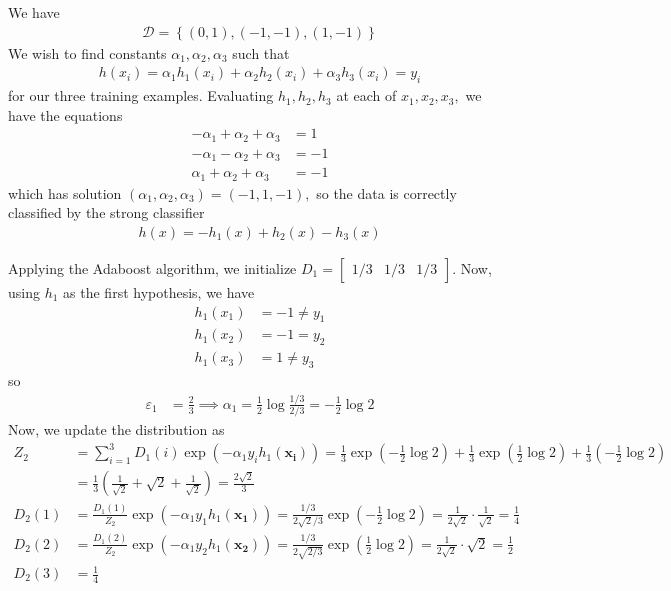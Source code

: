 \documentclass{article}
\begin{document}
\begin{soln}
	We have
	\begin{align*}
		\mathcal D = \left\{ (0, 1), (-1, -1), (1, -1) \right\}
	\end{align*}
	We wish to find constants $\alpha_1, \alpha_2, \alpha_3$ such that
	\begin{align*}
		h(x_i) = \alpha_1h_1(x_i) + \alpha_2h_2(x_i) + \alpha_3h_3(x_i) = y_i
	\end{align*}
	for our three training examples. Evaluating $h_1, h_2, h_3$ at each of $x_1, x_2, x_3,$ we have the equations
	\begin{align*}
		-\alpha_1 + \alpha_2 + \alpha_3 &= 1 \\
		-\alpha_1 - \alpha_2 + \alpha_3 &= -1 \\
		\alpha_1+\alpha_2+\alpha_3 &= -1
	\end{align*}
	which has solution $(\alpha_1, \alpha_2, \alpha_3) = (-1, 1, -1),$ so the data is correctly classified by the strong classifier 
	\begin{align*}
		h(x) = -h_1(x) + h_2(x) - h_3(x)
	\end{align*}

	Applying the Adaboost algorithm, we initialize $D_1 = \begin{bmatrix}
		1/3 & 1/3 & 1/3
	\end{bmatrix}.$ Now, using $h_1$ as the first hypothesis, we have
	\begin{align*}
		h_1(x_1) &= -1 \neq y_1 \\
		h_1(x_2) &= -1 = y_2 \\
		h_1(x_3) &= 1\neq y_3
	\end{align*}
	so
	\begin{align*}
		\varepsilon_1 &= \frac{2}{3} \implies \alpha_1 = \frac{1}{2}\log \frac{1/3}{2/3} = -\frac{1}{2}\log 2 
	\end{align*}
	Now, we update the distribution as
	\begin{align*}
		Z_2 &= \sum_{i=1}^{3} D_1(i) \exp(-\alpha_1 y_i h_1(\mathbf{x_i})) = \frac{1}{3} \exp\left( -\frac{1}{2}\log 2 \right) + \frac{1}{3}\exp\left( \frac{1}{2}\log 2 \right) + \frac{1}{3}\left( -\frac{1}{2}\log 2 \right) \\
		&= \frac{1}{3} \left( \frac{1}{\sqrt{2}} + \sqrt{2} + \frac{1}{\sqrt{2}} \right) = \frac{2\sqrt{2}}{3} \\
		D_2(1) &= \frac{D_1(1)}{Z_2} \exp\left( -\alpha_1y_1h_1(\mathbf{x_1}) \right) = \frac{1/3}{2\sqrt{2}/3} \exp\left( -\frac{1}{2}\log 2 \right) = \frac{1}{2\sqrt{2}}\cdot \frac{1}{\sqrt{2}} =\frac{1}{4} \\
		D_2(2) &= \frac{D_1(2)}{Z_2}\exp\left( -\alpha_1y_2h_1(\mathbf{x_2}) \right) = \frac{1/3}{2\sqrt{2/3}}\exp\left( \frac{1}{2}\log 2 \right) = \frac{1}{2\sqrt{2}}\cdot \sqrt{2} = \frac{1}{2} \\
		D_2(3) &= \frac{1}{4}
	\end{align*}


\end{soln}
\end{document}
